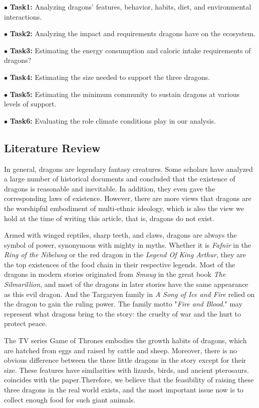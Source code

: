 \documentclass[12pt]{article}  %
\begin{document}
$\bullet$ \textbf{Task1: }Analyzing dragons' features, behavior, habits, diet, and environmental interactions.

$\bullet$ \textbf{Task2: }Analyzing the impact and requirements dragons have on the ecosystem.

$\bullet$ \textbf{Task3: }Estimating the energy consumption and caloric intake requirements of dragons?

$\bullet$ \textbf{Task4: }Estimating the size needed to support the three dragons.

$\bullet$ \textbf{Task5: }Estimating the minimum community to sustain dragons at various levels of support.

$\bullet$ \textbf{Task6: }Evaluating the role climate conditions play in our analysis.
\subsection{Literature Review}
\vspace{-0.3cm}

In general, dragons are legendary fantasy creatures. Some scholars have analyzed a large number of historical documents{\cite{5}} and concluded that the existence of dragons is reasonable and inevitable.{\cite{1}} In addition, they even gave the corresponding laws of existence. However, there are more views that dragons are the worshipful embodiment of multi-ethnic ideology,{\cite{2}} which is also the view we hold at the time of writing this article, that is, dragons do not exist.

Armed with winged reptiles, sharp teeth, and claws, dragons are always the symbol of power, synonymous with mighty in myths. Whether it is \textit{Fafnir} in the \textit{Ring of the Nibelung}{\cite{7}} or the red dragon{\cite{6}} in the \textit{Legend Of King Arthur}{\cite{8}}, they are the top existences of the food chain in their respective legends. Most of the dragons in modern stories originated from \textit{Smaug} in the great book \textit{The Silmarillion}{\cite{9}}, and most of the dragons in later stories have the same appearance as this evil dragon. And the Targaryen family{\cite{10}} in \textit{A Song of Ice and Fire} relied on the dragon to gain the ruling power. The family motto "\textit{Fire and Blood}." may represent what dragons bring to the story: the cruelty of war and the hurt to protect peace.

The TV series Game of Thrones embodies the growth habits of dragons, which are hatched from eggs and raised by cattle and sheep. Moreover, there is no obvious difference between the three little dragons in the story except for their size. These features have similarities with lizards, birds, and ancient pterosaurs. coincides with the paper{\cite{2}}.Therefore, we believe that the feasibility of raising these three dragons in the real world exists, and the most important issue now is to collect enough food for such giant animals.
\end{document}
